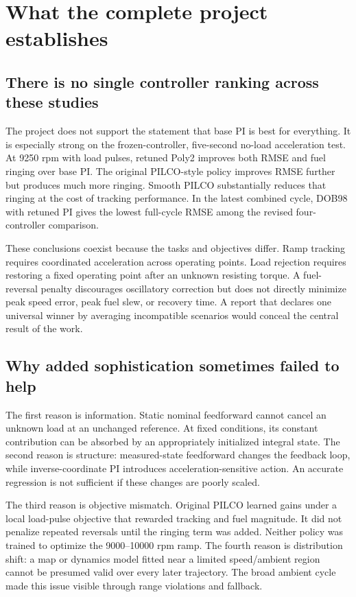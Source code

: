 \chapter{What the complete project establishes}
\section{There is no single controller ranking across these studies}
The project does not support the statement that base PI is best for everything. It is especially strong on the frozen-controller, five-second no-load acceleration test. At 9250 rpm with load pulses, retuned Poly2 improves both RMSE and fuel ringing over base PI. The original PILCO-style policy improves RMSE further but produces much more ringing. Smooth PILCO substantially reduces that ringing at the cost of tracking performance. In the latest combined cycle, DOB98 with retuned PI gives the lowest full-cycle RMSE among the revised four-controller comparison.

These conclusions coexist because the tasks and objectives differ. Ramp tracking requires coordinated acceleration across operating points. Load rejection requires restoring a fixed operating point after an unknown resisting torque. A fuel-reversal penalty discourages oscillatory correction but does not directly minimize peak speed error, peak fuel slew, or recovery time. A report that declares one universal winner by averaging incompatible scenarios would conceal the central result of the work.

\section{Why added sophistication sometimes failed to help}
The first reason is information. Static nominal feedforward cannot cancel an unknown load at an unchanged reference. At fixed conditions, its constant contribution can be absorbed by an appropriately initialized integral state. The second reason is structure: measured-state feedforward changes the feedback loop, while inverse-coordinate PI introduces acceleration-sensitive action. An accurate regression is not sufficient if these changes are poorly scaled.

The third reason is objective mismatch. Original PILCO learned gains under a local load-pulse objective that rewarded tracking and fuel magnitude. It did not penalize repeated reversals until the ringing term was added. Neither policy was trained to optimize the 9000--10000 rpm ramp. The fourth reason is distribution shift: a map or dynamics model fitted near a limited speed/ambient region cannot be presumed valid over every later trajectory. The broad ambient cycle made this issue visible through range violations and fallback.

